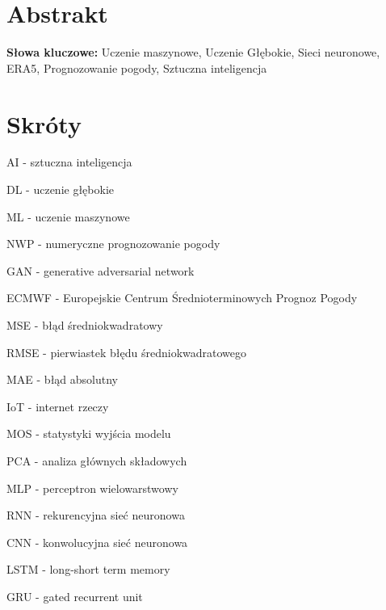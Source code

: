\documentclass{article}
\begin{document}

\begin{titlepage}
    
\end{titlepage}

\tableofcontents
\pagebreak

\section*{Abstrakt}

\noindent
{\bf Słowa kluczowe:} Uczenie maszynowe, Uczenie Głębokie, Sieci neuronowe,
ERA5, Prognozowanie pogody, Sztuczna inteligencja
\pagebreak










\section*{Skróty}

\raggedright{}

AI - sztuczna inteligencja

DL - uczenie głębokie

ML - uczenie maszynowe

NWP - numeryczne prognozowanie pogody

GAN - generative adversarial network

ECMWF - Europejskie Centrum Średnioterminowych Prognoz Pogody

MSE - błąd średniokwadratowy

RMSE - pierwiastek błędu średniokwadratowego

MAE - błąd absolutny

IoT - internet rzeczy

MOS - statystyki wyjścia modelu

PCA - analiza głównych składowych

MLP - perceptron wielowarstwowy

RNN - rekurencyjna sieć neuronowa

CNN - konwolucyjna sieć neuronowa

LSTM - long-short term memory

GRU - gated recurrent unit

\pagebreak
\printbibliography[title={Bibliografia}]

\end{document}
